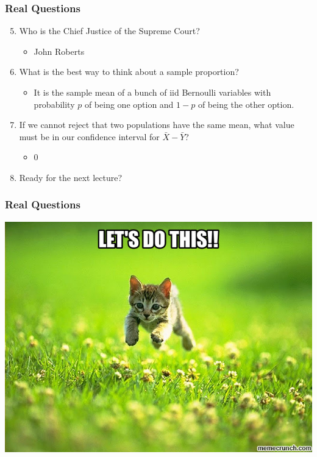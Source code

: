 \documentclass{beamer}
\begin{document}
\begin{frame}
\frametitle{Real Questions}
    \begin{enumerate}[<+- | alert@+>]
    \setcounter{enumi}{4}
    \item Who is the Chief Justice of the Supreme Court?
			\begin{itemize}
				\item John Roberts
			\end{itemize}			        
        \item What is the best way to think about a sample proportion?
            \begin{itemize}
                \item It is the sample mean of a bunch of iid Bernoulli variables with probability $p$ of being one option and $1-p$ of being the other option.
            \end{itemize}
           \item If we cannot reject that two populations have the same mean, what value must be in our confidence interval for $\bar{X} - \bar{Y}$?
           \begin{itemize}
           	\item 0
           \end{itemize}
     \item Ready for the next lecture?	
    \end{enumerate}
\end{frame} 

\begin{frame}
\frametitle{Real Questions}
    \centering
	   \includegraphics[scale = 0.4]{letsDoThis7.jpg}
\end{frame} 
\end{document}
